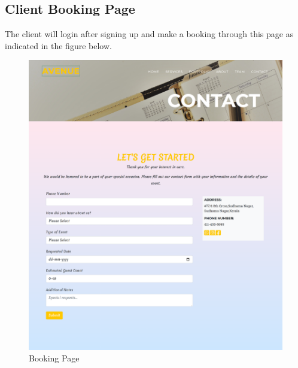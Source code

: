\subsection{Client Booking Page}
The client will login after signing up and make a booking through this page as indicated
in the figure below. 
\begin{figure}[H]
	\centering
	\includegraphics[scale=0.17]{Contact.png}
	\caption{Booking Page}
	\label{Booking Page}
\end{figure}
